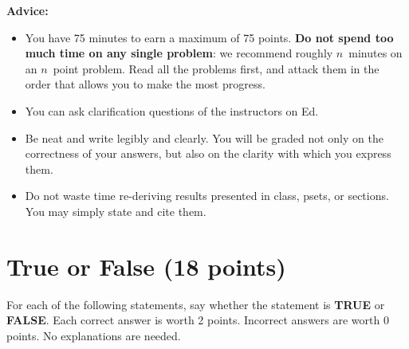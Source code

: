 \documentclass[11pt]{article}
\begin{document}
	
	\noindent\textbf{Advice:}
	\begin{itemize}
		\item You have 75 minutes to earn a maximum of 75 points. {\bf Do not spend too much time on any single problem}:
		we recommend roughly $n$~minutes on an $n$~point problem. Read all
		the problems first, and attack them in the order that allows you to
		make the most progress.
		\item You can ask clarification questions of the instructors on Ed.
		\item Be neat and write legibly and clearly. You will be graded not
		only on the correctness of your answers, but also on the clarity
		with which you express them.
		\item Do not waste time re-deriving results presented in class, psets,
		or sections. You may simply state and cite them.
	\end{itemize}
			
	
	\newpage
	
    \section{True or False (18 points)}
    
    For each of the following statements, say whether the statement is \textbf{TRUE} or \textbf{FALSE}. Each correct answer is worth 2 points. Incorrect answers are worth 0 points. No explanations are needed.
\end{document}
